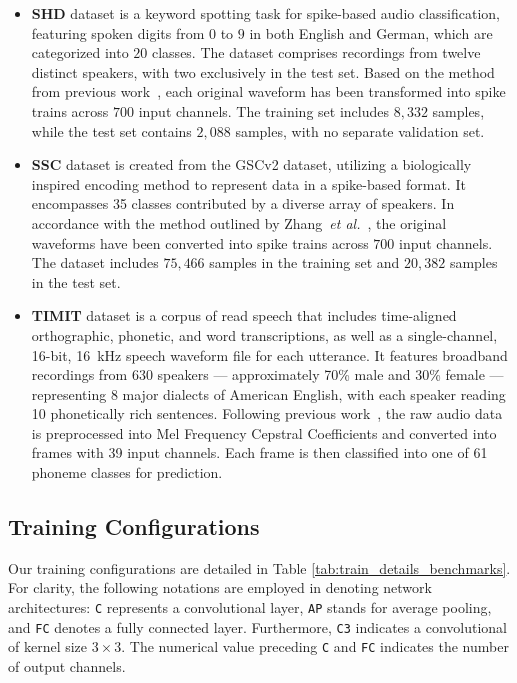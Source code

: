 \begin{itemize}
    \item \textbf{SHD} dataset is a keyword spotting task for spike-based audio classification, featuring spoken digits from $0$ to $9$ in both English and German, which are categorized into $20$ classes. The dataset comprises recordings from twelve distinct speakers, with two exclusively in the test set. Based on the method from previous work~\cite{TCLIF}, each original waveform has been transformed into spike trains across $700$ input channels. The training set includes $8,\!332$ samples, while the test set contains $2,\!088$ samples, with no separate validation set. 
    \item \textbf{SSC} dataset is created from the GSCv2 dataset, utilizing a biologically inspired encoding method to represent data in a spike-based format. It encompasses 35 classes contributed by a diverse array of speakers. In accordance with the method outlined by Zhang~\emph{et al.}~\cite{TCLIF}, the original waveforms have been converted into spike trains across $700$ input channels. The dataset includes $75,\!466$ samples in the training set and $20,\!382$ samples in the test set.
    \item \textbf{TIMIT} dataset is a corpus of read speech that includes time-aligned orthographic, phonetic, and word transcriptions, as well as a single-channel, 16-bit, \SI{16}{\kilo\hertz} speech waveform file for each utterance. It features broadband recordings from 630 speakers --- approximately 70\% male and 30\% female --- representing 8 major dialects of American English, with each speaker reading 10 phonetically rich sentences. Following previous work~\cite{Yin2021accurate}, the raw audio data is preprocessed into Mel Frequency Cepstral Coefficients and converted into frames with 39 input channels. Each frame is then classified into one of 61 phoneme classes for prediction.
\end{itemize}


\subsection{Training Configurations}
Our training configurations are detailed in Table \ref{tab:train_details_benchmarks}. For clarity, the following notations are employed in denoting network architectures: \texttt{C} represents a convolutional layer, \texttt{AP} stands for average pooling, and \texttt{FC} denotes a fully connected layer. Furthermore, \texttt{C3} indicates a convolutional of kernel size $3\times3$. The numerical value preceding \texttt{C} and \texttt{FC} indicates the number of output channels.


